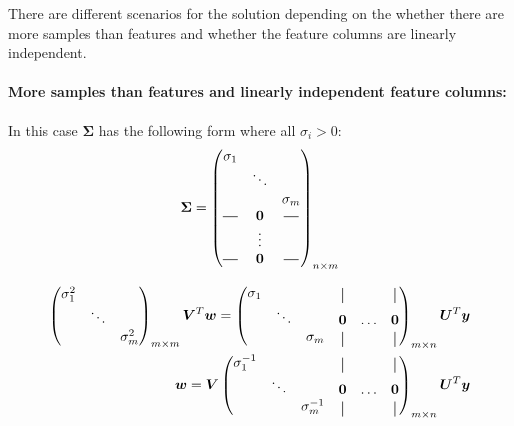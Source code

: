 There are different scenarios for the solution depending on the 
whether there are more samples than features and whether the feature columns are linearly independent.

\paragraph{More samples than features and linearly independent feature columns:}
In this case $\bm{\Sigma}$ has the following form where all $\sigma_i>0$:
\begin{align}
    \bm{\Sigma} = 
    \begin{pmatrix}
        \sigma_{1} &        &                \\
                     & \ddots &              \\
                     &        &  \sigma_{m}  \\
        \horzbar     & \bm{0} &  \horzbar    \\
                     & \vdots &              \\
        \horzbar     & \bm{0} &  \horzbar    \\
    \end{pmatrix}_{n \x m}
\end{align}

\begin{align}
    \begin{pmatrix}
        \sigma_{1}^2 &        &               \\
                     & \ddots &               \\
                     &        &  \sigma_{m}^2 \\
    \end{pmatrix}_{m \x m} \bm{V}^T \bm{w} = 
    \begin{pmatrix}
        \sigma_{1} &        &                & \vertbar &        & \vertbar \\
                     & \ddots &              & \bm{0}   & \hdots & \bm{0}   \\
                     &        &  \sigma_{m}  & \vertbar &        & \vertbar \\
    \end{pmatrix}_{m \x n}\bm{U}^T \bm{y} \\
    \bm{w} = 
    \bm{V}
    \begin{pmatrix}
        \sigma_{1}^{-1} &        &                & \vertbar &        & \vertbar \\
                     & \ddots &              & \bm{0}   & \hdots & \bm{0}   \\
                     &        &  \sigma_{m}^{-1}  & \vertbar &        & \vertbar \\
    \end{pmatrix}_{m \x n}\bm{U}^T \bm{y}
\end{align}

